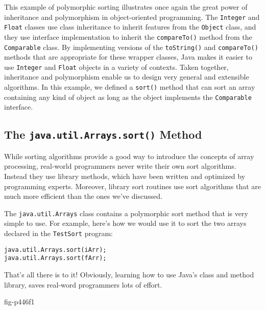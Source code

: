 This example of polymorphic sorting illustrates once again the great
power of inheritance and polymorphism in object-oriented programming.
The {\tt Integer} and {\tt Float} classes use class inheritance to
inherit features from the {\tt Object} class, and they use interface
implementation to inherit the {\tt compareTo()} method from the {\tt
Comparable} class.  By implementing versions of the {\tt toString()}
and {\tt compareTo()} methods that are appropriate for these wrapper
classes, Java makes it easier to use {\tt Integer} and {\tt Float}
objects in a variety of contexts.  Taken together, inheritance and
polymorphism enable us to design very general and extensible
algorithms.  In this example, we defined a {\tt sort()} method that
can sort an array containing any kind of object as long as the object
implements the {\tt Comparable} interface. 

\subsection{The {\tt java.util.Arrays.sort()} Method}

\noindent While sorting algorithms provide a good way to introduce the
concepts of array processing, real-world programmers never write their
own sort algorithms. Instead they use library methods, which have been
written and optimized by programming experts. Moreover, library sort
routines use sort algorithms that are much more efficient than the
ones we've discussed.

The {\tt java.util.Arrays} class contains a polymorphic sort
method that is very simple to use. For example, here's how we
would use it to sort the two arrays declared in the {\tt TestSort}
program:

\begin{jjjlisting}
\begin{lstlisting}
java.util.Arrays.sort(iArr);
java.util.Arrays.sort(fArr);
\end{lstlisting}
\end{jjjlisting}

\noindent That's all there is to it! Obviously, learning how to use
Java's class and method library, saves real-word programmers lots of
effort.

{fig-p446f1}



